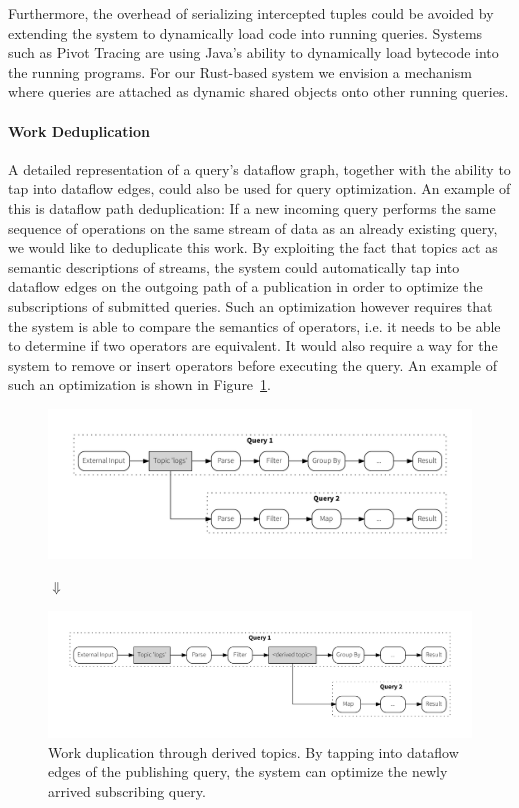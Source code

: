 Furthermore, the overhead of serializing intercepted tuples could be avoided
by extending the system to dynamically load code into running queries. Systems
such as Pivot Tracing are using Java's ability to dynamically load
bytecode into the running programs. For our Rust-based system we envision a
mechanism where queries are attached as dynamic shared objects onto other
running queries.

\paragraph{Work Deduplication}

A detailed representation of a query's dataflow graph, together with the ability
to tap into dataflow edges, could also be used for query optimization. An example
of this is dataflow path deduplication: If a new incoming query performs the same
sequence of operations on the same stream of data as an already existing
query, we would like to deduplicate this work. By exploiting the fact that
topics act as semantic descriptions of streams, the system could automatically
tap into dataflow edges on the outgoing path of a publication in order to
optimize the subscriptions of submitted queries. Such an optimization however
requires that the system is able to compare the semantics of operators,
i.e. it needs to be able to determine if two operators are equivalent. It
would also require a way for the system to remove or insert operators before
executing the query.
An example of such an optimization is shown in Figure~\ref{fig:queryoptimization}.

\begin{figure}[!htb]
  \includegraphics[scale=0.36]{figures/composition/q1q2_man}
  \vspace{-1.5em}
  \begin{center}
  $\Downarrow$
  \end{center}
  \vspace{-1.2em}
  \includegraphics[scale=0.36]{figures/composition/q1q2_auto}
  \caption[Work deduplication through derived topics]{
  Work duplication through derived topics. By tapping into dataflow edges
  of the publishing query, the system can optimize the newly arrived
  subscribing query.}
  \label{fig:queryoptimization}
\end{figure}




